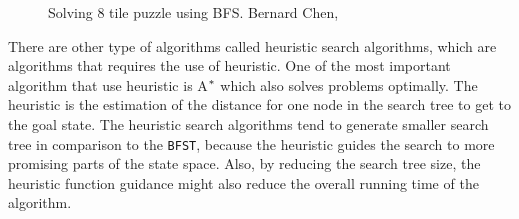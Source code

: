 \iftrue
\begin{landscape}
\begin{figure}[htb]

\resizebox{\dimexpr\linewidth-1cm}{!}{%
\begin{forest}
[\usebox\myboxbfsone
  [\usebox\myboxbfstwo
	[\usebox\myboxbfsfive
		[\usebox\myboxbfsten
			[\usebox\myboxbfstwenty
				[\usebox\myboxbfsthirtyfour]
				[\usebox\myboxbfsthirtyfive]			
			]		
		]
		[\usebox\myboxbfseleven
			[\usebox\myboxbfstwentyone
				[\usebox\myboxbfsthirtysix]
				[\usebox\myboxbfsthirtyseven]			
			]
			[\usebox\myboxbfstwentytwo
				[\usebox\myboxbfsthirtyeight]
				[\usebox\myboxbfsthirtynine]			
			]
			[\usebox\myboxbfstwentythree
				[\usebox\myboxbfsforty]
				[\usebox\myboxbfsfortyone]			
			]		
		]	
	]  
  ]
  [\usebox\myboxbfsthree
	[\usebox\myboxbfssix
		[\usebox\myboxbfstwelve
			[\usebox\myboxbfstwentyfour
				[\usebox\myboxbfsfortytwo]
				[\usebox\myboxbfsfortythree]			
			]		
		]
		[\usebox\myboxbfsthirteen
			[\usebox\myboxbfstwentyfive
				[\usebox\myboxbfsfortyfour]
				[\usebox\myboxbfsfortyfive]			
			]		
		]	
	]
	[\usebox\myboxbfsseven
		[\usebox\myboxbfsfourteen
			[\usebox\myboxbfstwentysix
				[\usebox\myboxbfsfortysix]			
			]		
		]
		[\usebox\myboxbfsfifteen
			[\usebox\myboxbfstwentyseven]		
		]	
	]
	[\usebox\myboxbfseight
		[\usebox\myboxbfssixteen
			[\usebox\myboxbfstwentyeight]		
		]
		[\usebox\myboxbfsseventeen
			[\usebox\myboxbfstwentynine]		
		]	
	]  
  ]
  [\usebox\myboxbfsfour
	[\usebox\myboxbfsnine
		[\usebox\myboxbfseighteen
			[\usebox\myboxbfsthirty]
			[\usebox\myboxbfsthirtyone]
			[\usebox\myboxbfsthirtytwo]
		]
		[\usebox\myboxbfsnineteen
			[\usebox\myboxbfsthirtythree]		
		]
	]  
  ]
]
\end{forest}
}
\caption{Solving 8 tile puzzle using BFS. Bernard Chen, \citeyear{bernard2011}} \label{fig:bfs_solution}
\end{figure}
\end{landscape}
\fi

There are other type of algorithms called heuristic search algorithms, which are algorithms that requires the use of heuristic. One of the most important algorithm that use heuristic is A$\sp{*}$ which also solves problems optimally. The heuristic is the estimation of the distance for one node in the search tree to get to the goal state. The heuristic search algorithms tend to generate smaller search tree in comparison to the \texttt{BFST}, because the heuristic guides the search to more promising parts of the state space. Also, by reducing the search tree size, the heuristic function guidance might also reduce the overall running time of the algorithm.

